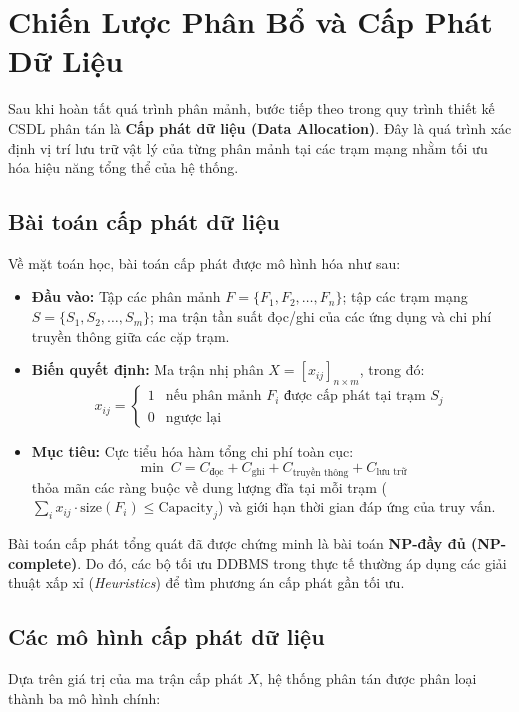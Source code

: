 \documentclass[12pt,a4paper]{report}
\begin{document}
\section{Chiến Lược Phân Bổ và Cấp Phát Dữ Liệu}

Sau khi hoàn tất quá trình phân mảnh, bước tiếp theo trong quy trình thiết kế CSDL phân tán là \textbf{Cấp phát dữ liệu (Data Allocation)}. Đây là quá trình xác định vị trí lưu trữ vật lý của từng phân mảnh tại các trạm mạng nhằm tối ưu hóa hiệu năng tổng thể của hệ thống.

\subsection{Bài toán cấp phát dữ liệu}
Về mặt toán học, bài toán cấp phát được mô hình hóa như sau:
\begin{itemize}[leftmargin=0.8cm, topsep=2pt, itemsep=2pt]
    \item \textbf{Đầu vào:} Tập các phân mảnh $F = \{F_1, F_2, \dots, F_n\}$; tập các trạm mạng $S = \{S_1, S_2, \dots, S_m\}$; ma trận tần suất đọc/ghi của các ứng dụng và chi phí truyền thông giữa các cặp trạm.
    \item \textbf{Biến quyết định:} Ma trận nhị phân $X = [x_{ij}]_{n \times m}$, trong đó:
    \[
    x_{ij} = \begin{cases} 
    1 & \text{nếu phân mảnh } F_i \text{ được cấp phát tại trạm } S_j \\ 
    0 & \text{ngược lại} 
    \end{cases}
    \]
    \item \textbf{Mục tiêu:} Cực tiểu hóa hàm tổng chi phí toàn cục:
    \[
    \min \ C = C_{\text{đọc}} + C_{\text{ghi}} + C_{\text{truyền thông}} + C_{\text{lưu trữ}}
    \]
    thỏa mãn các ràng buộc về dung lượng đĩa tại mỗi trạm ($\sum_{i} x_{ij} \cdot \text{size}(F_i) \le \text{Capacity}_j$) và giới hạn thời gian đáp ứng của truy vấn.
\end{itemize}
Bài toán cấp phát tổng quát đã được chứng minh là bài toán \textbf{NP-đầy đủ (NP-complete)}. Do đó, các bộ tối ưu DDBMS trong thực tế thường áp dụng các giải thuật xấp xỉ (\textit{Heuristics}) để tìm phương án cấp phát gần tối ưu.

\subsection{Các mô hình cấp phát dữ liệu}
Dựa trên giá trị của ma trận cấp phát $X$, hệ thống phân tán được phân loại thành ba mô hình chính:
\end{document}
